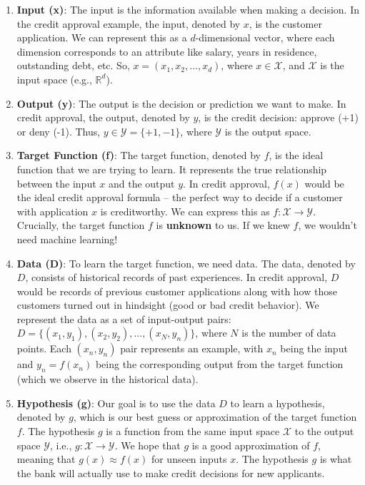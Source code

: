 \documentclass{article}
\begin{document}
\begin{enumerate}
    \item \textbf{Input (x)}: The input is the information available when making a decision. In the credit approval example, the input, denoted by \(x\), is the customer application. We can represent this as a \(d\)-dimensional vector, where each dimension corresponds to an attribute like salary, years in residence, outstanding debt, etc.  So, \(x = (x_1, x_2, ..., x_d)\), where \(x \in \mathcal{X}\), and \(\mathcal{X}\) is the input space (e.g., \(\mathbb{R}^d\)).

    \item \textbf{Output (y)}: The output is the decision or prediction we want to make. In credit approval, the output, denoted by \(y\), is the credit decision: approve (+1) or deny (-1). Thus, \(y \in \mathcal{Y} = \{+1, -1\}\), where \(\mathcal{Y}\) is the output space.

    \item \textbf{Target Function (f)}: The target function, denoted by \(f\), is the ideal function that we are trying to learn. It represents the true relationship between the input \(x\) and the output \(y\). In credit approval, \(f(x)\) would be the ideal credit approval formula – the perfect way to decide if a customer with application \(x\) is creditworthy. We can express this as \(f: \mathcal{X} \rightarrow \mathcal{Y}\).  Crucially, the target function \(f\) is \textbf{unknown} to us. If we knew \(f\), we wouldn't need machine learning!

    \item \textbf{Data (D)}: To learn the target function, we need data.  The data, denoted by \(D\), consists of historical records of past experiences. In credit approval, \(D\) would be records of previous customer applications along with how those customers turned out in hindsight (good or bad credit behavior). We represent the data as a set of input-output pairs: \(D = \{(x_1, y_1), (x_2, y_2), ..., (x_N, y_n)\}\), where \(N\) is the number of data points. Each \((x_n, y_n)\) pair represents an example, with \(x_n\) being the input and \(y_n = f(x_n)\) being the corresponding output from the target function (which we observe in the historical data).

    \item \textbf{Hypothesis (g)}: Our goal is to use the data \(D\) to learn a hypothesis, denoted by \(g\), which is our best guess or approximation of the target function \(f\).  The hypothesis \(g\) is a function from the same input space \(\mathcal{X}\) to the output space \(\mathcal{Y}\), i.e., \(g: \mathcal{X} \rightarrow \mathcal{Y}\). We hope that \(g\) is a good approximation of \(f\), meaning that \(g(x) \approx f(x)\) for unseen inputs \(x\). The hypothesis \(g\) is what the bank will actually use to make credit decisions for new applicants.
\end{enumerate}
\end{document}
